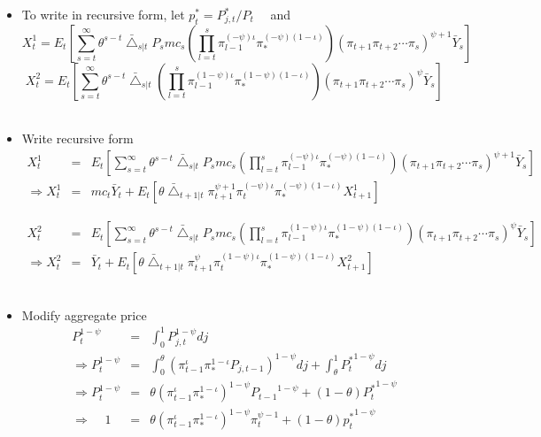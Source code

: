 \documentclass[11pt, a4paper]{article}
\begin{document}
\begin{itemize}
\item To write in recursive form, let   $p_t^* = P_{j,t}^*/P_t$ ~~and  \\ 
 \[X_t^1 = E_t \left[  \sum_{s=t}^{\infty}  \theta^{s-t}  \bar{\bigtriangleup}_{s|t}  P_s mc_s \left(  \prod_{l=t}^s \pi_{l-1}^{(-\psi)\iota} \pi_*^{{(-\psi)(1-\iota)}}  \right) {{(\pi_{t+1}\pi_{t+2}\cdots \pi_{s})}^{\psi+1}}\bar{Y}_s\right]\] \[X_t^2 =  E_t \left[  \sum_{s=t}^{\infty}  \theta^{s-t}  \bar{\bigtriangleup}_{s|t}  \left( \prod_{l=t}^s \pi_{l-1}^{(1-\psi)\iota} \pi_*^{{(1-\psi)}(1-\iota) }  \right){{(\pi_{t+1}\pi_{t+2}\cdots \pi_{s})}^{\psi}}\bar{Y}_s \right]\] \\

 \item Write recursive form
\begin{eqnarray*}  X_t^1 &=& E_t \left[  \sum_{s=t}^{\infty}  \theta^{s-t}  \bar{\bigtriangleup}_{s|t}  P_s mc_s \left(  \prod_{l=t}^s \pi_{l-1}^{(-\psi)\iota} \pi_*^{{(-\psi)(1-\iota)}}  \right) {{(\pi_{t+1}\pi_{t+2}\cdots \pi_{s})}^{\psi+1}}\bar{Y}_s\right] \\
 \Rightarrow X_t^1 &=&  mc_t \bar{Y}_t + E_t \left[\theta \bar{\bigtriangleup}_{t+1|t}  \pi_{t+1}^{\psi +1} \pi_t^{(-\psi)\iota} \pi_*^{{(-\psi)}(1-\iota) } X_{t+1}^1 \right] \end{eqnarray*} 

\begin{eqnarray*} X_t^2 &=& E_t \left[  \sum_{s=t}^{\infty}  \theta^{s-t}  \bar{\bigtriangleup}_{s|t}  P_s mc_s \left(  \prod_{l=t}^s \pi_{l-1}^{(1-\psi)\iota} \pi_*^{{(1-\psi)(1-\iota)}}  \right) {{(\pi_{t+1}\pi_{t+2}\cdots \pi_{s})}^{\psi}} \bar{Y}_s\right] \\
\Rightarrow  X_t^2 &=&  \bar{Y}_t + E_t \left[\theta \bar{\bigtriangleup}_{t+1|t}  \pi_{t+1}^{\psi} \pi_t^{(1-\psi)\iota} \pi_*^{{(1-\psi)}(1-\iota) } X_{t+1}^2 \right]
\end{eqnarray*} \\


 \item Modify aggregate price 
\begin{eqnarray*}
P_{t}^{1-\psi} &=&  \int_0^1 P_{j,t}^{1-\psi} dj  \\
  \Rightarrow P_{t}^{1-\psi} &=&  \int_0^{\theta} \left( \pi_{t-1}^\iota \pi_*^{1-\iota} P_{j,t-1} \right)^{1-\psi} dj + \int_{\theta}^1 {P_t^{*}}^{1-\psi} dj \\  
  \Rightarrow P_{t}^{1-\psi} &=&  {\theta} {(\pi_{t-1}^\iota \pi_*^{1-\iota})}^{1-\psi} {P_{t-1}}^{1-\psi}  + (1-\theta)  {P_t^{*}}^{1-\psi}    \\
    \Rightarrow~~~~~ 1 &=&  {\theta} {(\pi_{t-1}^\iota \pi_*^{1-\iota})}^{1-\psi} \pi_t^{\psi-1}  + (1-\theta)  {p_t^{*}}^{1-\psi}
\end{eqnarray*} 

\end{itemize}
\end{document}

